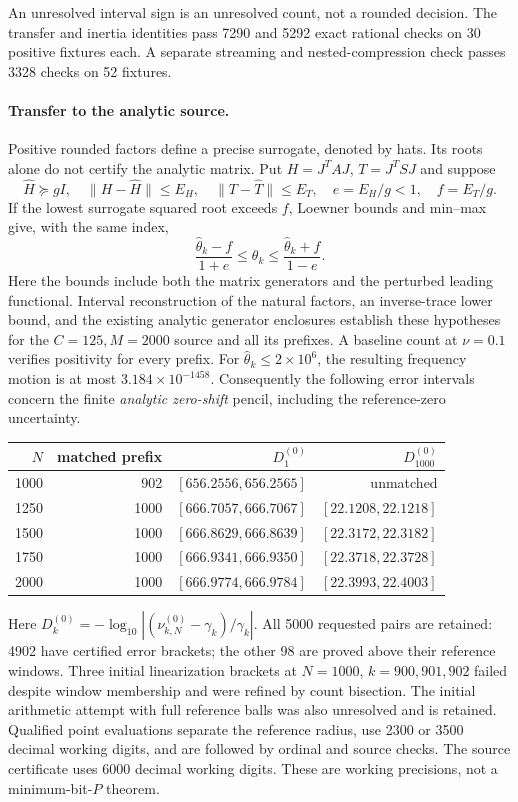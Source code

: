 An unresolved interval sign is an unresolved count, not a rounded
decision. The transfer and inertia identities pass 7290 and 5292 exact
rational checks on 30 positive fixtures each. A separate streaming and
nested-compression check passes 3328 checks on 52 fixtures.

\paragraph{Transfer to the analytic source.}
Positive rounded factors define a precise surrogate, denoted by hats.
Its roots alone do not certify the analytic matrix. Put
$H=J^TAJ$, $T=J^TSJ$ and suppose
\[
 \widehat H\succeq gI,\quad
 \|H-\widehat H\|\le E_H,\quad
 \|T-\widehat T\|\le E_T,\quad e=E_H/g<1,\quad f=E_T/g.
\]
If the lowest surrogate squared root exceeds $f$, Loewner bounds and
min--max give, with the same index,
\[
 \frac{\widehat\theta_k-f}{1+e}\le\theta_k
             \le\frac{\widehat\theta_k+f}{1-e}.
\]
Here the bounds include both the matrix generators and the perturbed
leading functional. Interval reconstruction of the natural factors,
an inverse-trace lower bound, and the existing analytic generator
enclosures establish these hypotheses for the $C=125,M=2000$ source
and all its prefixes. A baseline count at $\nu=0.1$ verifies positivity
for every prefix. For $\widehat\theta_k\le2\times10^6$, the resulting
frequency motion is at most $3.184\times10^{-1458}$. Consequently the
following error intervals concern the finite \emph{analytic zero-shift}
pencil, including the reference-zero uncertainty.

\begin{center}
\begin{tabular}{rrrr}
\toprule
$N$ & matched prefix & $D^{(0)}_1$ & $D^{(0)}_{1000}$ \\
\midrule
1000 & 902 & $[656.2556,656.2565]$ & unmatched \\
1250 & 1000 & $[666.7057,666.7067]$ & $[22.1208,22.1218]$ \\
1500 & 1000 & $[666.8629,666.8639]$ & $[22.3172,22.3182]$ \\
1750 & 1000 & $[666.9341,666.9350]$ & $[22.3718,22.3728]$ \\
2000 & 1000 & $[666.9774,666.9784]$ & $[22.3993,22.4003]$ \\
\bottomrule
\end{tabular}
\end{center}
Here $D^{(0)}_k=-\log_{10}|(\nu^{(0)}_{k,N}-\gamma_k)/\gamma_k|$.
All 5000 requested pairs are retained: 4902 have certified error
brackets; the other 98 are proved above their reference windows.
Three initial linearization brackets at $N=1000$, $k=900,901,902$
failed despite window membership and were refined by count bisection.
The initial arithmetic attempt with full reference balls was also
unresolved and is retained. Qualified point evaluations separate the
reference radius, use 2300 or 3500 decimal working digits, and are
followed by ordinal and source checks. The source certificate uses
6000 decimal working digits. These are working precisions, not a
minimum-bit-$P$ theorem.

